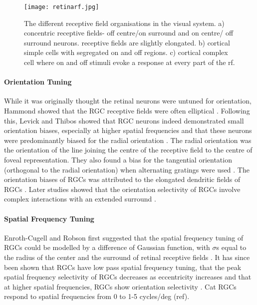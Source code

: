 \begin{figure}[H]
	
	\texttt{[image: retinarf.jpg]}
	\centering
	\caption{The different receptive field organisations in the visual system. a) concentric receptive fields- off centre/on surround and on centre/ off surround neurons. receptive fields are slightly elongated. b) cortical simple cells with segregated on and off regions. c) cortical complex cell where on and off stimuli evoke a response at every part of the rf.}
	
	\label{fig:rforg}
\end{figure}

\paragraph{Orientation Tuning}

While it was originally thought the retinal neurons were untuned for orientation, Hammond showed that the RGC receptive fields were often elliptical \cite{Hammond1974}. Following this, Levick and Thibos showed that RGC neurons indeed demonstrated small orientation biases, especially at higher spatial frequencies and that these neurons were predominantly biased for the radial orientation \cite{Levick1980, Levick1982c}. The radial orientation was the orientation of the line joining the centre of the receptive field to the centre of foveal representation. They also found a bias for the tangential orientation (orthogonal to the radial orientation) when alternating gratings were used \cite{Thibos1985}. The orientation biases of RGCs was attributed to the elongated dendritic fields of RGCs \cite{Leventhal1983a}. Later studies showed that the orientation selectivity of RGCs involve complex interactions with an extended surround \cite{Shou2000}.

\paragraph{Spatial Frequency Tuning}

Enroth-Cugell and Robson first suggested that the spatial frequency tuning of RGCs could be modelled by a difference of Gaussian function, with $\sigma$s equal to the radius of the center and the surround of retinal receptive fields \cite{Enroth-cugell1966b}. It has since been shown that RGCs have low pass spatial frequency tuning, that the peak spatial frequency selectivity of RGCs decreases as eccentricity increases and that at higher spatial frequencies, RGCs show orientation selectivity \cite{Levick1980, Levick1982c}. Cat RGCs respond to spatial frequencies from 0 to 1-5 cycles/deg (ref).

